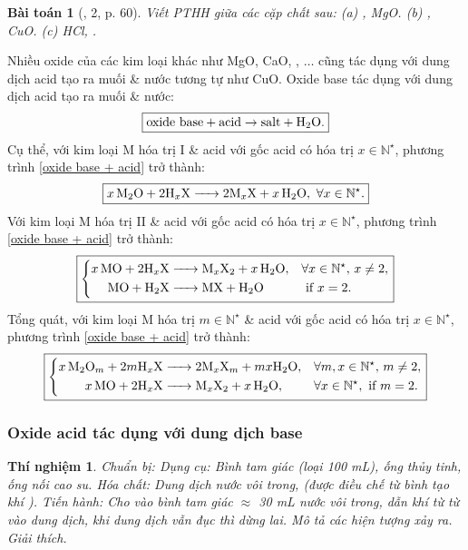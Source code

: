 \documentclass{article}
\newtheorem{baitoan}{Bài toán}
\newtheorem{thinghiem}{Thí nghiệm}
\begin{document}
\begin{baitoan}[\cite{SGK_KHTN_8_Canh_Dieu}, 2, p. 60]
	Viết PTHH giữa các cặp chất sau: (a) \emph{, MgO}. (b) \emph{, CuO}. (c) \emph{HCl, }.
\end{baitoan}
Nhiều oxide của các kim loại khác như MgO, CaO, , $\ldots$ cũng tác dụng với dung dịch acid tạo ra muối \& nước tương tự như CuO. Oxide base tác dụng với dung dịch acid tạo ra muối \& nước:
\begin{align}
	\label{oxide base + acid}
	\boxed{\mbox{oxide base} + \mbox{acid}\to\mbox{salt} + \ce{H2O}.}
\end{align}
Cụ thể, với kim loại M hóa trị I \& acid  với gốc acid  có hóa trị $x\in\mathbb{N}^\star$, phương trình \eqref{oxide base + acid} trở thành:
\begin{align}
	\boxed{\ce{$x$M2O + $2$H_xX -> $2$M_xX + $x$H2O},\ \forall x\in\mathbb{N}^\star.}
\end{align}
Với kim loại M hóa trị II \& acid  với gốc acid  có hóa trị $x\in\mathbb{N}^\star$, phương trình \eqref{oxide base + acid} trở thành:
\begin{equation}
	\boxed{\left\{\begin{split}
			\ce{$x$MO + $2$H_xX &-> M_xX2 + $x$H2O},&&\forall x\in\mathbb{N}^\star,\,x\ne2,\\
			\ce{MO + H2X &-> MX + H2O}&&\mbox{ if } x = 2.
		\end{split}\right.}
\end{equation}
Tổng quát, với kim loại M hóa trị $m\in\mathbb{N}^\star$ \& acid  với gốc acid  có hóa trị $x\in\mathbb{N}^\star$, phương trình \eqref{oxide base + acid} trở thành:
\begin{equation}
	\boxed{\left\{\begin{split}
			\ce{$x$M2O_m + $2m$H_xX &-> $2$M_xX_m + $mx$H2O},&&\forall m,x\in\mathbb{N}^\star,\,m\ne2,\\
			\ce{$x$MO + $2$H_xX &-> M_xX2 + $x$H2O},&&\forall x\in\mathbb{N}^\star,\mbox{ if } m = 2.
		\end{split}\right.}
\end{equation}

\subsubsection{Oxide acid tác dụng với dung dịch base}

\begin{thinghiem}
	\emph{Chuẩn bị:} Dụng cụ: Bình tam giác (loại \emph{100 mL}), ống thủy tinh, ống nối cao su. Hóa chất: Dung dịch nước vôi trong, \emph{} (được điều chế từ bình tạo khí \emph{}). \emph{Tiến hành:} Cho vào bình tam giác $\approx$ \emph{30 mL} nước vôi trong, dẫn khí \emph{} từ từ vào dung dịch, khi dung dịch vẫn đục thì dừng lai. Mô tả các hiện tượng xảy ra. Giải thích.
\end{thinghiem}
\end{document}

